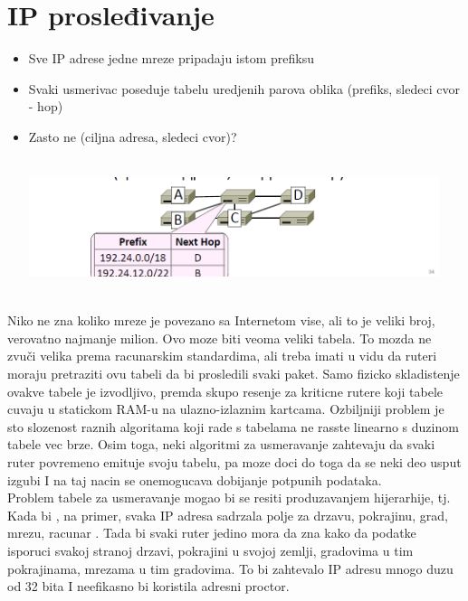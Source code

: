 \documentclass{article} %
\begin{document}
\section{IP prosleđivanje}
\begin{itemize}
  \item Sve IP adrese jedne mreze pripadaju istom prefiksu
\item Svaki usmerivac poseduje tabelu uredjenih parova oblika (prefiks, sledeci cvor - hop)
\item Zasto ne (ciljna adresa, sledeci cvor)?
 \begin{center}
\includegraphics[width=12cm, height=4cm]{prosledjivanje}\\
\end{center}
\end{itemize}
Niko ne zna koliko mreze je  povezano sa Internetom vise, ali to je veliki broj, verovatno najmanje milion. Ovo moze biti veoma veliki tabela. To mozda ne zvuči velika prema racunarskim standardima, ali treba imati u vidu  da ruteri moraju pretraziti ovu  tabeli da bi prosledili svaki paket.  Samo fizicko skladistenje ovakve tabele je izvodljivo, premda skupo resenje za kriticne rutere koji tabele cuvaju u statickom RAM-u na ulazno-izlaznim kartcama. Ozbiljniji problem je sto slozenost raznih algoritama koji rade s tabelama ne rasste linearno s duzinom tabele vec brze. Osim toga, neki algoritmi za usmeravanje zahtevaju da svaki ruter povremeno emituje svoju tabelu, pa moze doci do toga da se neki deo usput izgubi I na taj nacin se onemogucava dobijanje potpunih podataka. \\

Problem tabele za usmeravanje mogao bi se resiti produzavanjem hijerarhije, tj. Kada bi  , na primer, svaka IP adresa sadrzala polje za drzavu, pokrajinu, grad, mrezu, racunar . Tada bi svaki ruter jedino mora da zna kako da podatke isporuci svakoj stranoj drzavi, pokrajini u svojoj zemlji, gradovima u tim pokrajinama, mrezama u tim gradovima. To bi zahtevalo IP adresu mnogo duzu od 32 bita I neefikasno bi koristila adresni proctor.\\
\end{document}
